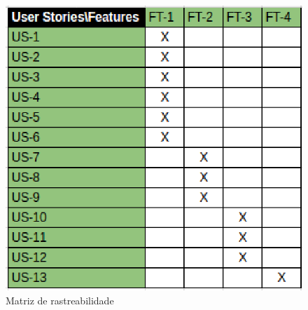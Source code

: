 \begin{figure}[h]
    \centering
    \label{fig01}
        \includegraphics[keepaspectratio=true,scale=0.9]{figuras/RallyDev/matriz2.eps}
    \caption{Matriz de rastreabilidade}
\end{figure}

\tab \\ \\ \\ \\ \\ \\ \\ \\ \\ \\ \\ \\ \\ \\ \\ \\ \\ \\ \\ \\ \\ \\ \\ \\ \\ \\ \\ \\ \\ \\

